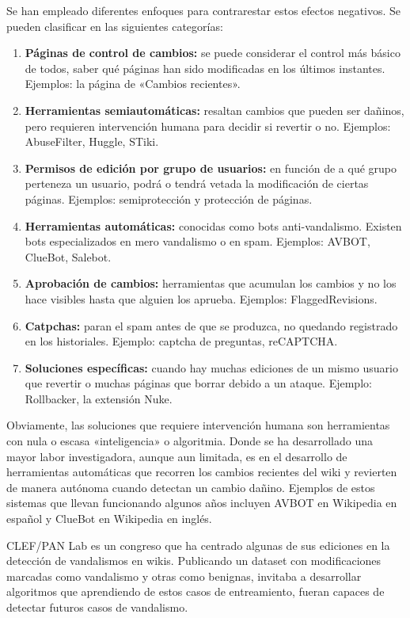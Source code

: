 \documentclass[11pt,onecolumn]{article}
\begin{document}
Se han empleado diferentes enfoques para contrarestar estos efectos negativos. Se pueden clasificar en las siguientes categorías:
\begin{enumerate}
\item \textbf{Páginas de control de cambios:} se puede considerar el control más básico de todos, saber qué páginas han sido modificadas en los últimos instantes. Ejemplos: la página de «Cambios recientes».
\item \textbf{Herramientas semiautomáticas:} resaltan cambios que pueden ser dañinos, pero requieren intervención humana para decidir si revertir o no. Ejemplos: AbuseFilter, Huggle, STiki.
\item \textbf{Permisos de edición por grupo de usuarios:} en función de a qué grupo perteneza un usuario, podrá o tendrá vetada la modificación de ciertas páginas. Ejemplos: semiprotección y protección de páginas.
\item \textbf{Herramientas automáticas:} conocidas como bots anti-vandalismo. Existen bots especializados en mero vandalismo o en spam. Ejemplos: AVBOT, ClueBot, Salebot.
\item \textbf{Aprobación de cambios:} herramientas que acumulan los cambios y no los hace visibles hasta que alguien los aprueba. Ejemplos: FlaggedRevisions.
\item \textbf{Catpchas:} paran el spam antes de que se produzca, no quedando registrado en los historiales. Ejemplo: captcha de preguntas, reCAPTCHA.
\item \textbf{Soluciones específicas:} cuando hay muchas ediciones de un mismo usuario que revertir o muchas páginas que borrar debido a un ataque. Ejemplo: Rollbacker, la extensión Nuke.
\end{enumerate}

Obviamente, las soluciones que requiere intervención humana son herramientas con nula o escasa «inteligencia» o algoritmia. Donde se ha desarrollado una mayor labor investigadora, aunque aun limitada, es en el desarrollo de herramientas automáticas que recorren los cambios recientes del wiki y revierten de manera autónoma cuando detectan un cambio dañino. Ejemplos de estos sistemas que llevan funcionando algunos años incluyen AVBOT \citep{avbot2009, avbot2010} en Wikipedia en español y ClueBot \citep{carter2008} en Wikipedia en inglés.

CLEF/PAN Lab es un congreso que ha centrado algunas de sus ediciones en la detección de vandalismos en wikis. Publicando un dataset con modificaciones marcadas como vandalismo y otras como benignas, invitaba a desarrollar algoritmos que aprendiendo de estos casos de entreamiento, fueran capaces de detectar futuros casos de vandalismo.
\end{document}
